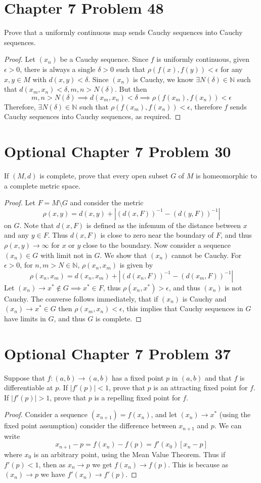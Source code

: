\documentclass{article}
\newtheorem{proof}{Proof}
\def\to{\rightarrow}
\def\NN{\mathbb N}
\begin{document}
\section{Chapter 7 Problem 48} Prove that a uniformly
continuous map sends Cauchy sequences into Cauchy sequences.
\begin{proof}
Let $(x_n)$ be a Cauchy sequence. Since $f$ is uniformly
continuous, given $\epsilon>0$, there is always a single $\delta>0$
such that $\rho(f(x),f(y))<\epsilon$ for any $x,y\in M$ with
$d(x,y)<\delta$. Since $(x_n)$ is Cauchy, we know $\exists N(\delta)\in \NN$
such that $d(x_m,x_n)<\delta, m,n>N(\delta)$. But then
\[
m,n>N(\delta) \implies d(x_m,x_n)<\delta \implies \rho(f(x_m),f(x_n)) < \epsilon 
\]
Therefore, $\exists N(\delta)\in\NN$ such that $\rho(f(x_m),f(x_n))<\epsilon$,
therefore $f$ sends Cauchy sequences into Cauchy sequences, as required.
\end{proof}
\section{Optional Chapter 7 Problem 30} If $(M,d)$ is complete, prove
that every open subset $G$ of $M$ is homeomorphic
to a complete metric space.
\begin{proof}
Let $F=M\setminus G$ and consider the metric
\[
\rho(x,y) = d(x,y) + |(d(x,F))^{-1} - (d(y,F))^{-1}|
\]
on $G$. Note that $d(x,F)$ is defined as the infemum of the distance
between $x$ and any $y\in F$. Thus $d(x,F)$ is close to zero near
the boundary of $F$, and thus $\rho(x,y)\to\infty$ for $x$ or $y$
close to the boundary. Now consider a sequence $(x_n)\in G$
with limit not in $G$. We show that $(x_n)$ cannot be Cauchy.
For $\epsilon>0$, for $n,m> N\in\NN$, $\rho(x_n,x_m)$ is given by
\[
\rho(x_n,x_m) = d(x_n,x_m) + | (d(x_n,F))^{-1} - (d(x_m,F))^{-1}|
\]
Let $(x_n)\to x^* \not\in G\implies x^*\in F$, thus
$\rho(x_n,x^*)>\epsilon$, and thus $(x_n)$ is not Cauchy. The converse
follows immediately, that if $(x_n)$ is Cauchy and $(x_n)\to x^*\in G$ then
$\rho(x_m,x_n)<\epsilon$, this implies that Cauchy sequences in $G$
have limits in $G$, and thus $G$ is complete.
\end{proof}

\section{Optional Chapter 7 Problem 37} Suppose that $f:(a,b)\to(a,b)$
has a fixed point $p$ in $(a,b)$ and that $f$ is differentiable at
$p$. If $|f'(p)|<1$, prove that $p$ is an attracting fixed point
for $f$. If $|f'(p)|>1$, prove that $p$ is a repelling fixed point for $f$.
\begin{proof}
Consider a sequence $(x_{n+1})=f(x_n)$, and let $(x_n)\to x^*$ (using
the fixed point assumption)
consider the difference
between $x_{n+1}$ and $p$. We can write
\[
x_{n+1}-p = f(x_n)-f(p) = f'(x_0)[x_n-p]
\]
where $x_0$ is an arbitrary point, using the Mean Value Theorem.
Thus if $f'(p)<1$, then as $x_n\to p$ we get $f(x_n)\to f(p)$. This
is because as $(x_n)\to p$ we have $f'(x_n)\to f'(p)$.
\end{proof}
\end{document}
